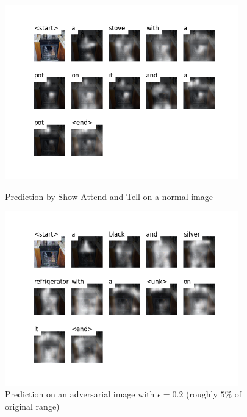 \begin{figure}
    \centering
    \begin{minipage}{0.45\textwidth}
        \centering
        \includegraphics[width=0.9\textwidth]{figures/caption_kitchen_normal.png} %
        \caption{Prediction by Show Attend and Tell on a normal image}
    \end{minipage}\hfill
    \begin{minipage}{0.45\textwidth}
        \centering
        \includegraphics[width=0.9\textwidth]{figures/caption_kitchen_adversarial.png} %
        \caption{Prediction on an adversarial image with $\epsilon=0.2$ (roughly $5\%$ of original range)}
    \end{minipage}
\end{figure}

